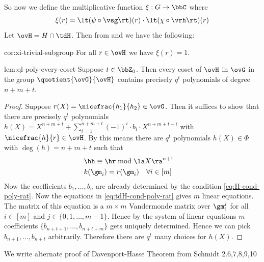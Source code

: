 So now we define the multiplicative function $\xi:G\to\bbC$ where $$\xi(r)=\lt(\psi\circ\vsg\rt)(r)\cdot \lt(\chi\circ\vrh\rt)(r)$$
Let $\ovH=H\cap \tdH$. Then from  and  we have the following:
\begin{corolary}{}{cor:xi-trivial-subgroup}
  For all $r\in \ovH$ we have $\xi(r)=1$. 
\end{corolary}
\begin{lemma}{}{lem:ql-poly-every-coset}
  Suppose $t\in\bbZ_0$. Then every coset of $\ovH$ in $\ovG$ in the group $\quotient{\ovG}{\ovH}$ contains precisely $q^t$ polynomials of degree $n+m+t$. 
\end{lemma}
\begin{proof}
  Suppose $r(X)=\nicefrac{h_1}{h_2}\in \ovG$. Then it suffices to show that there are precisely $q^t$ polynomials $h(X)=X^{n+m+t}+\sum_{i=1}^{n+m+t}(-1)^i\cdot b_i\cdot X^{n+m+t-i}$ with $\nicefrac{h}{r}\in\ovH$. By  this means there are $q^t$ polynomials $h(X)\in\Phi$ with $\deg(h)=n+m+t$ such that \begin{align}
    &\hh \equiv \hr\bmod{\la X\ra^{n+1}} \label{eq:H-cond-poly-rat}&\\
    &k(\gm_i) = r(\gm_i) \quad \forall i\in[m] \label{eq:tdH-cond-poly-rat}&
  \end{align}  Now the coefficients $b_1,\dots, b_n$ are already determined by the condition \eqref{eq:H-cond-poly-rat}. Now the equations in \eqref{eq:tdH-cond-poly-rat} gives $m$ linear equations. The matrix of this equation is a $m\times m$ Vandermonde matrix over $\gm_i^j$ for all $i\in[m]$ and $j\in\{0,1,\dots, m-1\}$. Hence by the system of linear equations $m$ coefficients $\{b_{n+t+1},\dots, b_{n+t+m}\}$ gets uniquely determined. Hence we can pick $b_{n+1},\dots, b_{n+t}$ arbitrarily. Therefore there are $q^t$ many choices for $h(X)$. 
\end{proof}

We write alternate proof of Davenport-Hasse Theorem from Schmidt 2.{6,7,8,9,10}